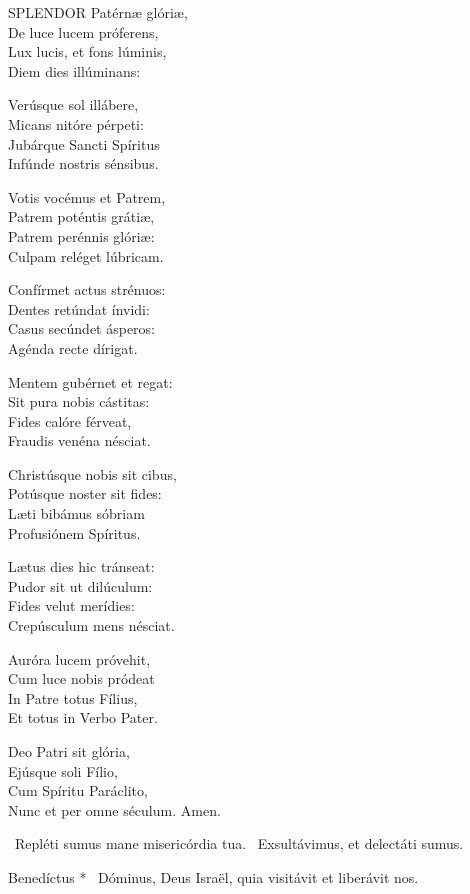 
\lettrine[lines=2]{S}{PLENDOR} Patérnæ glóriæ,\\
De luce lucem próferens,\\
Lux lucis, et fons lúminis,\\
Diem dies illúminans:

Verúsque sol illábere,\\
Micans nitóre pérpeti:\\
Jubárque Sancti Spíritus\\
Infúnde nostris sénsibus.

Votis vocémus et Patrem,\\
Patrem poténtis grátiæ,\\
Patrem perénnis glóriæ:\\
Culpam reléget lúbricam.

Confírmet actus strénuos:\\
Dentes retúndat ínvidi:\\
Casus secúndet ásperos:\\
Agénda recte dírigat.

Mentem gubérnet et regat:\\
Sit pura nobis cástitas:\\
Fides calóre férveat,\\
Fraudis venéna nésciat.

Christúsque nobis sit cibus,\\
Potúsque noster sit fides:\\
Læti bibámus sóbriam\\
Profusiónem Spíritus.

Lætus dies hic tránseat:\\
Pudor sit ut dilúculum:\\
Fides velut merídies:\\
Crepúsculum mens nésciat.

Auróra lucem próvehit,\\
Cum luce nobis pródeat\\
In Patre totus Fílius,\\
Et totus in Verbo Pater.

Deo Patri sit glória,\\
Ejúsque soli Fílio,\\
Cum Spíritu Paráclito,\\
Nunc et per omne séculum. Amen.

\V\ Repléti sumus mane misericórdia tua. \R\ Exsultávimus, et delectáti sumus.

 Benedíctus * \textdagger\ Dóminus, Deus Israël, quia visitávit et liberávit nos.

